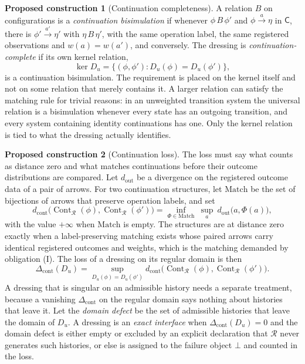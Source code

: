 \documentclass[11pt]{article}
\theoremstyle{plain}
\theoremstyle{definition}
\newtheorem{construction}{Proposed construction}
\theoremstyle{remark}
\newcommand{\R}{\mathcal R}
\newcommand{\Cont}{\operatorname{Cont}}
\begin{document}
\begin{construction}[Continuation completeness]\label{con:bisim}
A relation $B$ on configurations is a \emph{continuation bisimulation} if whenever $\phi\,B\,\phi'$ and $\phi\xrightarrow{a}\eta$ in $\mathsf C$, there is $\phi'\xrightarrow{a'}\eta'$ with $\eta\,B\,\eta'$, with the same operation label, the same registered observations and $w(a)=w(a')$, and conversely. The dressing is \emph{continuation-complete} if its own kernel relation,
\begin{equation}
\ker D_u=\{(\phi,\phi'):D_u(\phi)=D_u(\phi')\},
\end{equation}
is a continuation bisimulation. The requirement is placed on the kernel itself and not on some relation that merely contains it. A larger relation can satisfy the matching rule for trivial reasons: in an unweighted transition system the universal relation is a bisimulation whenever every state has an outgoing transition, and every system containing identity continuations has one. Only the kernel relation is tied to what the dressing actually identifies.
\end{construction}

\begin{construction}[Continuation loss]\label{con:loss}
The loss must say what counts as distance zero and what matches continuations before their outcome distributions are compared. Let $d_{\mathrm{out}}$ be a divergence on the registered outcome data of a pair of arrows. For two continuation structures, let $\mathrm{Match}$ be the set of bijections of arrows that preserve operation labels, and set
\begin{equation}
d_{\mathrm{cont}}\big(\Cont_\R(\phi),\Cont_\R(\phi')\big)=\inf_{\Phi\in\mathrm{Match}}\ \sup_{a}\ d_{\mathrm{out}}\big(a,\Phi(a)\big),
\end{equation}
with the value $+\infty$ when $\mathrm{Match}$ is empty. The structures are at distance zero exactly when a label-preserving matching exists whose paired arrows carry identical registered outcomes and weights, which is the matching demanded by obligation (I). The loss of a dressing on its regular domain is then
\begin{equation}\label{eq:loss}
\Delta_{\mathrm{cont}}(D_u)=\sup_{D_u(\phi)=D_u(\phi')} d_{\mathrm{cont}}\big(\Cont_\R(\phi),\Cont_\R(\phi')\big).
\end{equation}
A dressing that is singular on an admissible history needs a separate treatment, because a vanishing $\Delta_{\mathrm{cont}}$ on the regular domain says nothing about histories that leave it. Let the \emph{domain defect} be the set of admissible histories that leave the domain of $D_u$. A dressing is an \emph{exact interface} when $\Delta_{\mathrm{cont}}(D_u)=0$ and the domain defect is either empty or excluded by an explicit declaration that $\R$ never generates such histories, or else is assigned to the failure object $\bot$ and counted in the loss.
\end{construction}
\end{document}
